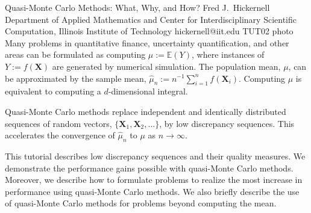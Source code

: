 \documentclass[12pt,a4paper,figuresright]{book}
\begin{document}
\begin{talk}
 {Quasi-Monte Carlo Methods:  What, Why, and How?}%
 {Fred J.~Hickernell}%
 {Department of Applied Mathematics and Center for Interdisciplinary Scientific Computation, Illinois Institute of Technology}%
 {hickernell@iit.edu}%
 {}%
 {}%
 {}%
 {TUT02}%
 {photo}%
Many problems in  quantitative finance, uncertainty quantification, and other areas can be formulated as computing $\mu := \mathbb{E}(Y)$, where instances of $Y:=f(\boldsymbol{X})$ are generated by numerical simulation. The population mean, $\mu$, can be approximated by the sample mean, $\hat{\mu}_n := n^{-1} \sum_{i=1}^n f(\boldsymbol{X}_i)$.  Computing $\mu$ is equivalent to computing a $d$-dimensional integral.

Quasi-Monte Carlo methods replace independent and identically distributed  sequences of random vectors, $\{\boldsymbol{X}_1, \boldsymbol{X}_2, \ldots \}$, by low discrepancy sequences.  This accelerates the convergence of $\hat{\mu}_n$ to $\mu$ as $n \to \infty$. 


This tutorial describes  low discrepancy sequences  and their quality measures.  We demonstrate the performance gains possible with quasi-Monte Carlo methods.  Moreover, we describe how to formulate problems to realize the most increase in performance using quasi-Monte Carlo methods.  We also briefly describe the use of quasi-Monte Carlo methods for problems beyond computing the mean.

\end{talk}

\clearpage
\end{document}
